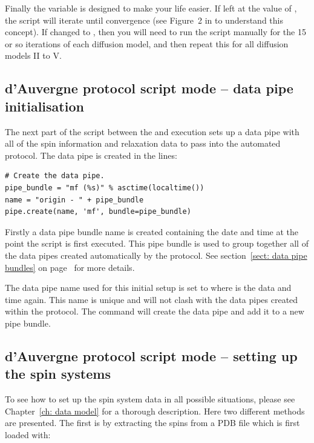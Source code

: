 Finally the  variable is designed to make your life easier.
If left at the value of , the script will iterate until convergence (see Figure~2 in \citet{dAuvergneGooley08b} to understand this concept).
If changed to , then you will need to run the script manually for the 15 or so iterations of each diffusion model, and then repeat this for all diffusion models II to V.



\subsection{d'Auvergne protocol script mode -- data pipe initialisation}

The next part of the script between the  and execution sets up a data pipe with all of the spin information and relaxation data to pass into the automated protocol.
The data pipe is created in the lines:

\begin{lstlisting}[firstnumber=156]
# Create the data pipe.
pipe_bundle = "mf (%s)" % asctime(localtime())
name = "origin - " + pipe_bundle
pipe.create(name, 'mf', bundle=pipe_bundle)
\end{lstlisting}

Firstly a data pipe bundle name is created containing the date and time at the point the script is first executed.
This pipe bundle is used to group together all of the data pipes created automatically by the protocol.
See section~\ref{sect: data pipe bundles} on page~\pageref{sect: data pipe bundles} for more details.

The data pipe name used for this initial setup is set to  where  is the data and time again.
This name is unique and will not clash with the data pipes created within the protocol.
The  command will create the data pipe and add it to a new pipe bundle.



\subsection{d'Auvergne protocol script mode -- setting up the spin systems}

To see how to set up the spin system data in all possible situations, please see Chapter~\ref{ch: data model} for a thorough description.
Here two different methods are presented.
The first is by extracting the spins from a PDB file which is first loaded with:

